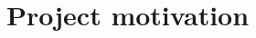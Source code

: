 \documentclass[12pt,oneside,openany,a4paper, %
english, %
masters-t, goldenblock]{usthesis}
\begin{document}





\section{Project motivation}



\end{document}

